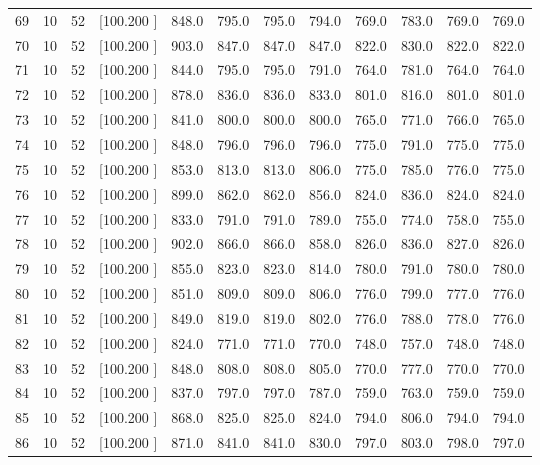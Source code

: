 \documentclass[12pt,a4paper]{article}
\begin{document}
\begin{center}
{\begin{tabular}{r r r r r r r r r r r r}
  69& 10& 52&[100.200   ]&   848.0&   795.0&   795.0&   794.0&   769.0&   783.0&   769.0&   769.0\\[-0.02in]
  70& 10& 52&[100.200   ]&   903.0&   847.0&   847.0&   847.0&   822.0&   830.0&   822.0&   822.0\\[-0.02in]
  71& 10& 52&[100.200   ]&   844.0&   795.0&   795.0&   791.0&   764.0&   781.0&   764.0&   764.0\\[-0.02in]
  72& 10& 52&[100.200   ]&   878.0&   836.0&   836.0&   833.0&   801.0&   816.0&   801.0&   801.0\\[-0.02in]
  73& 10& 52&[100.200   ]&   841.0&   800.0&   800.0&   800.0&   765.0&   771.0&   766.0&   765.0\\[-0.02in]
  74& 10& 52&[100.200   ]&   848.0&   796.0&   796.0&   796.0&   775.0&   791.0&   775.0&   775.0\\[-0.02in]
  75& 10& 52&[100.200   ]&   853.0&   813.0&   813.0&   806.0&   775.0&   785.0&   776.0&   775.0\\[-0.02in]
  76& 10& 52&[100.200   ]&   899.0&   862.0&   862.0&   856.0&   824.0&   836.0&   824.0&   824.0\\[-0.02in]
  77& 10& 52&[100.200   ]&   833.0&   791.0&   791.0&   789.0&   755.0&   774.0&   758.0&   755.0\\[-0.02in]
  78& 10& 52&[100.200   ]&   902.0&   866.0&   866.0&   858.0&   826.0&   836.0&   827.0&   826.0\\[-0.02in]
  79& 10& 52&[100.200   ]&   855.0&   823.0&   823.0&   814.0&   780.0&   791.0&   780.0&   780.0\\[-0.02in]
  80& 10& 52&[100.200   ]&   851.0&   809.0&   809.0&   806.0&   776.0&   799.0&   777.0&   776.0\\[-0.02in]
  81& 10& 52&[100.200   ]&   849.0&   819.0&   819.0&   802.0&   776.0&   788.0&   778.0&   776.0\\[-0.02in]
  82& 10& 52&[100.200   ]&   824.0&   771.0&   771.0&   770.0&   748.0&   757.0&   748.0&   748.0\\[-0.02in]
  83& 10& 52&[100.200   ]&   848.0&   808.0&   808.0&   805.0&   770.0&   777.0&   770.0&   770.0\\[-0.02in]
  84& 10& 52&[100.200   ]&   837.0&   797.0&   797.0&   787.0&   759.0&   763.0&   759.0&   759.0\\[-0.02in]
  85& 10& 52&[100.200   ]&   868.0&   825.0&   825.0&   824.0&   794.0&   806.0&   794.0&   794.0\\[-0.02in]
  86& 10& 52&[100.200   ]&   871.0&   841.0&   841.0&   830.0&   797.0&   803.0&   798.0&   797.0\\[-0.02in]

\end{tabular}}
\end{center}
\end{document}
